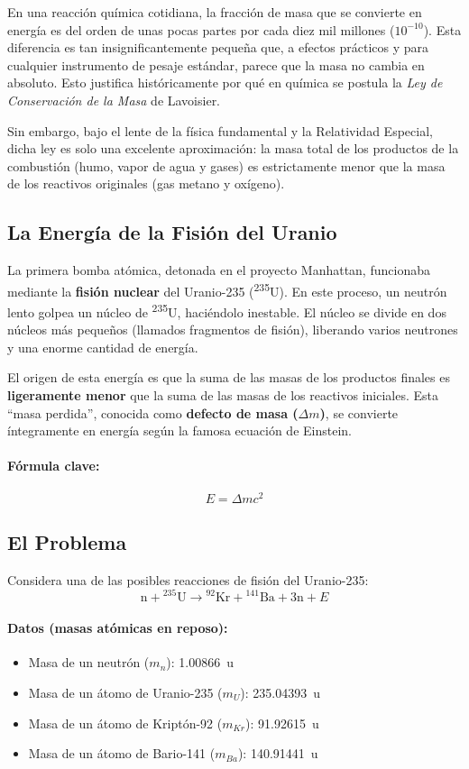 \documentclass[11pt,a4paper]{book}
\begin{document}
En una reacción química cotidiana, la fracción de masa que se convierte en energía es del orden de unas pocas partes por cada diez mil millones ($10^{-10}$). Esta diferencia es tan insignificantemente pequeña que, a efectos prácticos y para cualquier instrumento de pesaje estándar, parece que la masa no cambia en absoluto. Esto justifica históricamente por qué en química se postula la \textit{Ley de Conservación de la Masa} de Lavoisier. 

Sin embargo, bajo el lente de la física fundamental y la Relatividad Especial, dicha ley es solo una excelente aproximación: la masa total de los productos de la combustión (humo, vapor de agua y gases) es estrictamente menor que la masa de los reactivos originales (gas metano y oxígeno).

\subsection{La Energía de la Fisión del Uranio}
\label{sec:fision-uranio}

La primera bomba atómica, detonada en el proyecto Manhattan, funcionaba mediante la \textbf{fisión nuclear} del Uranio-235 (\textsuperscript{235}U). En este proceso, un neutrón lento golpea un núcleo de \textsuperscript{235}U, haciéndolo inestable. El núcleo se divide en dos núcleos más pequeños (llamados fragmentos de fisión), liberando varios neutrones y una enorme cantidad de energía.

El origen de esta energía es que la suma de las masas de los productos finales es \textbf{ligeramente menor} que la suma de las masas de los reactivos iniciales. Esta ``masa perdida'', conocida como \textbf{defecto de masa ($\Delta m$)}, se convierte íntegramente en energía según la famosa ecuación de Einstein.

\paragraph{Fórmula clave:}
\[ E = \Delta m c^2 \]

\subsection*{El Problema}
Considera una de las posibles reacciones de fisión del Uranio-235:
\[ \text{n} + {}^{235}\text{U} \rightarrow {}^{92}\text{Kr} + {}^{141}\text{Ba} + 3\text{n} + E \]

\paragraph{Datos (masas atómicas en reposo):}
\begin{itemize}
    \item Masa de un neutrón ($m_n$): \SI{1.00866}{\atomicmassunit}
    \item Masa de un átomo de Uranio-235 ($m_U$): \SI{235.04393}{\atomicmassunit}
    \item Masa de un átomo de Kriptón-92 ($m_{Kr}$): \SI{91.92615}{\atomicmassunit}
    \item Masa de un átomo de Bario-141 ($m_{Ba}$): \SI{140.91441}{\atomicmassunit}
\end{itemize}
\end{document}
